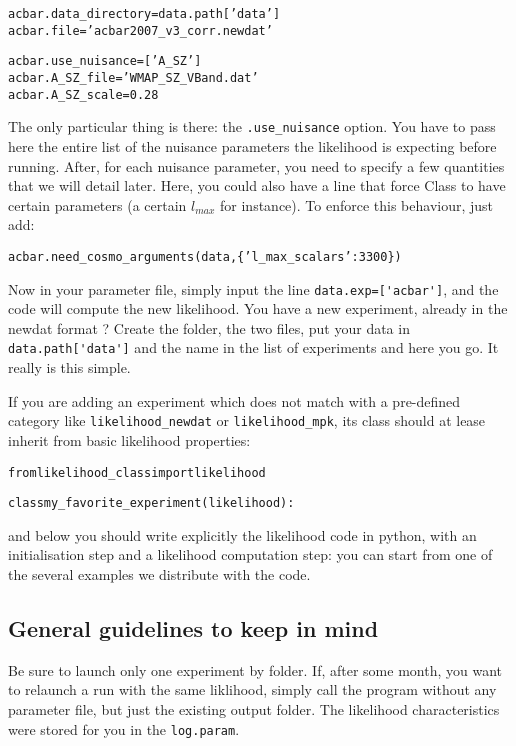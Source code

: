 \documentclass[10pt]{article}
\begin{document}
  \begin{alltt}
    acbar.data_directory = data.path['data']
    acbar.file           = 'acbar2007_v3_corr.newdat'

    acbar.use_nuisance   = ['A_SZ']
    acbar.A_SZ_file      = 'WMAP_SZ_VBand.dat'
    acbar.A_SZ_scale     = 0.28
  \end{alltt}

  The only particular thing is there: the \verb?.use_nuisance? option. You have
  to pass here the entire list of the nuisance parameters the likelihood is
  expecting before running. After, for each nuisance parameter, you need to
  specify a few quantities that we will detail later.  Here, you could also have a line that
  force Class to have certain parameters (a certain $l_{max}$ for instance). To
  enforce this behaviour, just add:
  \begin{alltt}
    acbar.need_cosmo_arguments(data,\{'l_max_scalars':3300\})
  \end{alltt}

  Now in your parameter file, simply input the line \verb?data.exp=['acbar']?,
  and the code will compute the new likelihood. You have a new experiment,
  already in the newdat format ? Create the folder, the two files, put your
  data in \verb?data.path['data']? and the name in the list of experiments and
  here you go. It really is this simple.
  
  If you are adding an experiment which does not match with a pre-defined category like \verb?likelihood_newdat? or \verb?likelihood_mpk?, its class should at lease inherit from basic likelihood properties:
    \begin{alltt}
  from likelihood_class import likelihood

  class my_favorite_experiment(likelihood):
    
  \end{alltt}

  and below you should write explicitly the likelihood code in python, with an initialisation step and a likelihood computation step: you can start from one of the several examples we distribute with the code.
  

  \subsection{General guidelines to keep in mind}
 Be sure to launch only one experiment by folder. If, after some month,
    you want to relaunch a run with the same liklihood, simply call the program without any
    parameter file, but just the existing output folder. The likelihood characteristics were stored for you in the \verb?log.param?.
\end{document}
